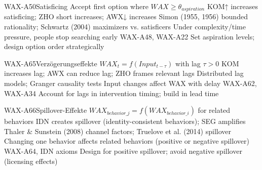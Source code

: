 
\begin{axiomspec}{WAX-A50}{Satisficing}
 Accept first option where $WAX \geq \theta_{aspiration}$
 KOM↑ increases satisficing; ZHO short increases; AWX↓ increases
 Simon (1955, 1956) bounded rationality; Schwartz (2004) maximizers vs. satisficers
 Under complexity/time pressure, people stop searching early
 WAX-A48, WAX-A22
 Set aspiration levels; design option order strategically
\end{axiomspec}


\begin{axiomspec}{WAX-A65}{Verzögerungseffekte}
 $WAX_t = f(Input_{t-\tau})$ with lag $\tau > 0$
 KOM increases lag; AWX can reduce lag; ZHO frames relevant lags
 Distributed lag models; Granger causality tests
 Input changes affect WAX with delay
 WAX-A62, WAX-A34
 Account for lags in intervention timing; build in lead time
\end{axiomspec}


\begin{axiomspec}{WAX-A66}{Spillover-Effekte}
 $WAX_{behavior\_j} = f(WAX_{behavior\_i})$ for related behaviors
 IDN creates spillover (identity-consistent behaviors); SEG amplifies
 Thaler \& Sunstein (2008) channel factors; Truelove et al. (2014) spillover
 Changing one behavior affects related behaviors (positive or negative spillover)
 WAX-A64, IDN axioms
 Design for positive spillover; avoid negative spillover (licensing effects)
\end{axiomspec}


